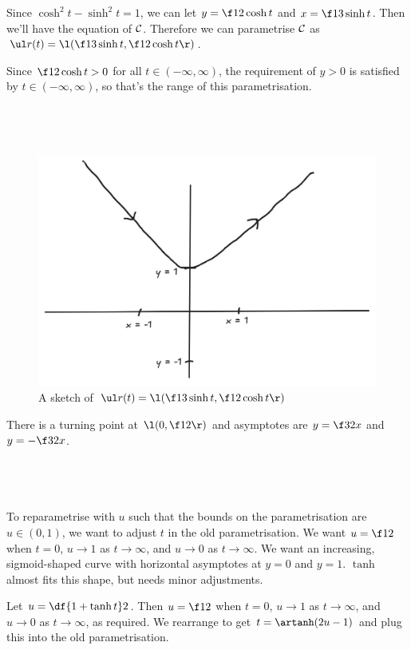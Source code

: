 \documentclass[a4paper]{article}
\begin{document}
Since $\cosh^2 t - \sinh^2 t = 1$, we can let $y = \f12 \cosh t$ and $x = \f13 \sinh t$. Then we'll have the equation of $\cal C$. Therefore we can parametrise $\cal C$ as $\ul r(t) = \l( \f13 \sinh t, \f12 \cosh t \r)$.

Since $\f12 \cosh t > 0$ for all $t \in (-\infty, \infty)$, the requirement of $y>0$ is satisfied by $t \in (-\infty, \infty)$, so that's the range of this parametrisation.

\subsection{~}

\begin{figure}[h]
	\centering
	\includegraphics[scale=0.3]{Q2b}
	\caption{A sketch of $\ul r(t) = \l( \f13 \sinh t, \f12 \cosh t \r)$}
\end{figure}

There is a turning point at $\l(0, \f12\r)$ and asymptotes are $y = \f32 x$ and $y = -\f32 x$.

\subsection{~}

To reparametrise with $u$ such that the bounds on the parametrisation are $u \in (0, 1)$, we want to adjust $t$ in the old parametrisation. We want $u = \f12$ when $t = 0$, $u \to 1$ as $t \to \infty$, and $u \to 0$ as $t \to \infty$. We want an increasing, sigmoid-shaped curve with horizontal asymptotes at $y=0$ and $y=1$. $\tanh$ almost fits this shape, but needs minor adjustments.

Let $u = \df{1 + \tanh t}2$. Then $u = \f12$ when $t = 0$, $u \to 1$ as $t \to \infty$, and $u \to 0$ as $t \to \infty$, as required. We rearrange to get $t = \artanh(2u - 1)$ and plug this into the old parametrisation.
\end{document}
